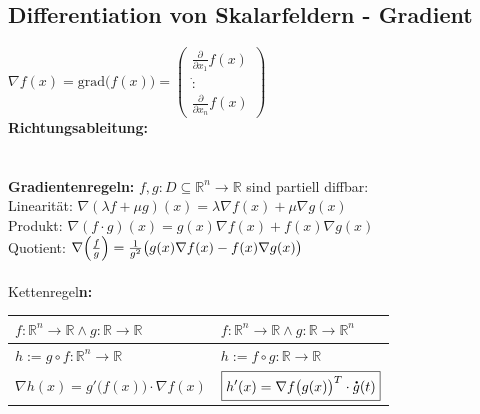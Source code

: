 \documentclass[6pt,a4paper]{scrartcl}
\let\olddot = \dot
\newcommand{\norm}[1]{\ensuremath{\|#1\|}}														%
\newcommand{\svdots}{\ensuremath{\olddot :}}													%
\renewcommand{\vec}[1]{\ensuremath{\boldsymbol {#1}}}											%
\renewcommand{\emph}[1]{\textbf{#1}}															%
\renewcommand*{\dot}[1]{\accentset{\mbox{\textrm{\large\bfseries .}} }{#1}}						%
\begin{document}
\begin{multicols*}{4}
\subsection{Differentiation von Skalarfeldern - Gradient}
$\nabla f(x) = \mathrm{grad} \bigl( f(x) \bigr) = \begin{pmatrix}  \frac{\partial}{\partial x_1} f(x) \\ \svdots \\ \frac{\partial}{\partial x_n} f(x) \end{pmatrix}$\\
\emph{Richtungsableitung:} \boxed { \partial_{\vec v} f(x) = \left\langle \nabla f(x), \vec v \right\rangle } \quad \boxed{ \norm{\vec v}=1 }\\
\\
\\
\textbf{Gradientenregeln:} $f,g:D \subseteq \mathbb R^n \rightarrow \mathbb R$ sind partiell diffbar:\\
Linearität: $\nabla(\lambda f + \mu g) (x) = \lambda \nabla f(x) + \mu \nabla g(x)$\\
Produkt: $\nabla (f \cdot g) (x) = g(x) \nabla f(x) + f(x) \nabla g(x)$\\
Quotient: $\nabla \Bigl( \frac{f}{g} \Bigr) = \frac{1}{g^2} \bigl( g(x)\nabla f(x) - f(x) \nabla g(x) \bigr)$\\
\\
Kettenregel\textbf{n:}\\
\begin{tabular}{l|l}
	$f:\mathbb R^n \rightarrow \mathbb R \land g:\mathbb R \rightarrow \mathbb R$ & $f:\mathbb R^n \rightarrow \mathbb R \land g:\mathbb R \rightarrow \mathbb R^n$\\ \midrule
	$h:= g \circ f: \mathbb R^n \rightarrow \mathbb R$	& $h:= f \circ g: \mathbb R \rightarrow \mathbb R$\\
	$\boxed{ \nabla h(x) = g'\big( f(x) \big) \cdot \nabla f(x)}$  &  $\boxed{h'(x)=\nabla f\big( g(x) \big)^T \cdot \dot g(t)}$
\end{tabular}



\end{multicols*}
\end{document}
